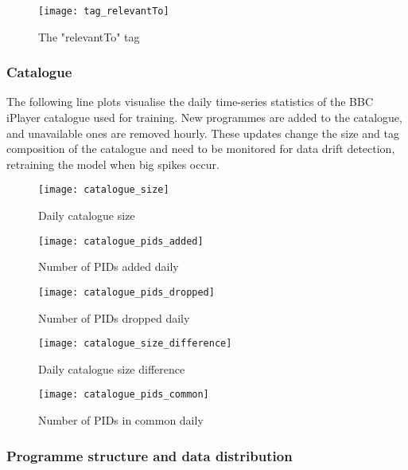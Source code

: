 \begin{figure}[H]
  \centering
  \texttt{[image: tag\_relevantTo]}
  \caption{The "relevantTo" tag}
  \label{fig:tag_relevantTo}
\end{figure}

\subsubsection{Catalogue}

The following line plots visualise the daily time-series statistics of the BBC iPlayer catalogue used for training.
New programmes are added to the catalogue, and unavailable ones are removed hourly.
These updates change the size and tag composition of the catalogue and need to be monitored for data drift detection,
retraining the model when big spikes occur.

\begin{figure}[H]
  \centering
  \texttt{[image: catalogue\_size]}
  \caption{Daily catalogue size}
  \label{fig:catalogue_size}
\end{figure}

\begin{figure}[H]
  \centering
  \texttt{[image: catalogue\_pids\_added]}
  \caption{Number of PIDs added daily}
  \label{fig:catalogue_pids_added}
\end{figure}

\begin{figure}[H]
  \centering
  \texttt{[image: catalogue\_pids\_dropped]}
  \caption{Number of PIDs dropped daily}
  \label{fig:catalogue_pids_dropped}
\end{figure}

\begin{figure}[H]
  \centering
  \texttt{[image: catalogue\_size\_difference]}
  \caption{Daily catalogue size difference}
  \label{fig:catalogue_size_diff}
\end{figure}

\begin{figure}[H]
  \centering
  \texttt{[image: catalogue\_pids\_common]}
  \caption{Number of PIDs in common daily}
  \label{fig:catalogue_size_diff}
\end{figure}

\subsubsection{Programme structure and data distribution}

